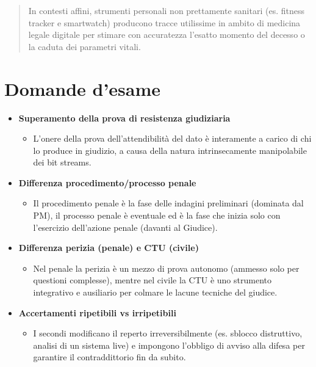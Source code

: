 \documentclass[11pt,a4paper]{article}
\begin{document}
\begin{quote}
In contesti affini, strumenti personali non prettamente sanitari (es. fitness tracker e smartwatch) producono tracce utilissime in ambito di medicina legale digitale per stimare con accuratezza l'esatto momento del decesso o la caduta dei parametri vitali.
\end{quote}


\section{ Domande d'esame}

\begin{itemize}
    \item \textbf{Superamento della prova di resistenza giudiziaria} 
    \begin{itemize}
        \item L'onere della prova dell'attendibilità del dato è interamente a carico di chi lo produce in giudizio, a causa della natura intrinsecamente manipolabile dei bit streams.
    \end{itemize}
    
    \item \textbf{Differenza procedimento/processo penale} 
    \begin{itemize}
        \item Il procedimento penale è la fase delle indagini preliminari (dominata dal PM), il processo penale è eventuale ed è la fase che inizia solo con l'esercizio dell'azione penale (davanti al Giudice).
    \end{itemize}
    
    \item \textbf{Differenza perizia (penale) e CTU (civile)} 
    \begin{itemize}
        \item Nel penale la perizia è un mezzo di prova autonomo (ammesso solo per questioni complesse), mentre nel civile la CTU è uno strumento integrativo e ausiliario per colmare le lacune tecniche del giudice.
    \end{itemize}
    
    \item \textbf{Accertamenti ripetibili vs irripetibili} 
    \begin{itemize}
        \item I secondi modificano il reperto irreversibilmente (es. sblocco distruttivo, analisi di un sistema live) e impongono l'obbligo di avviso alla difesa per garantire il contraddittorio fin da subito.
    \end{itemize}
    

\end{itemize}
\end{document}

